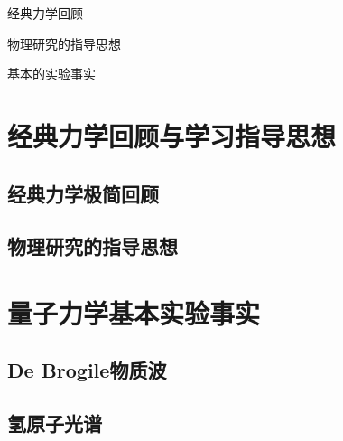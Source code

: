 \begin{introduction}
    \item 经典力学回顾
    \item 物理研究的指导思想
    \item 基本的实验事实
\end{introduction}

\section{经典力学回顾与学习指导思想}
    \subsection{经典力学极简回顾} 
    
    \subsection{物理研究的指导思想}
    
\section{量子力学基本实验事实}
    \subsection{De Brogile物质波}
    
    \subsection{氢原子光谱}